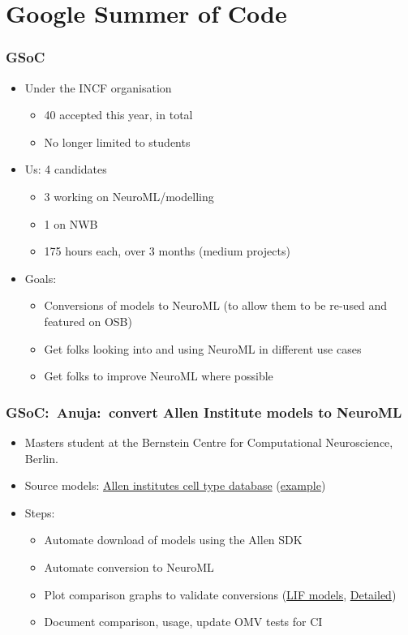 \section{Google Summer of Code}
\begin{frame}[c]
  \frametitle{GSoC}
  \begin{itemize}
    \item Under the INCF organisation
      \begin{itemize}
        \item 40 accepted this year, in total
        \item No longer limited to students
      \end{itemize}
      \pause{}
    \item Us: 4 candidates
      \begin{itemize}
        \item 3 working on NeuroML/modelling
        \item 1 on NWB
        \item 175 hours each, over 3 months (medium projects)
      \end{itemize}
      \pause{}
    \item Goals:
      \begin{itemize}
        \item Conversions of models to NeuroML (to allow them to be re-used and featured on OSB)
        \item Get folks looking into and using NeuroML in different use cases
          \pause{}
        \item Get folks to improve NeuroML where possible
      \end{itemize}
  \end{itemize}
\end{frame}
\begin{frame}[c]
  \frametitle{GSoC:\ Anuja:\ convert Allen Institute models to NeuroML}
  \begin{itemize}
    \item Masters student at the Bernstein Centre for Computational Neuroscience, Berlin.
      \pause{}
    \item Source models: \href{http://celltypes.brain-map.org/}{Allen institutes cell type database} (\href{http://celltypes.brain-map.org/experiment/electrophysiology/474626527}{example})
      \pause{}
    \item Steps:
      \begin{itemize}
        \item Automate download of models using the Allen SDK
        \item Automate conversion to NeuroML
        \item Plot comparison graphs to validate conversions (\href{https://github.com/OpenSourceBrain/AllenInstituteNeuroML/tree/master/CellTypesDatabase/models/GLIF}{LIF models}, \href{https://github.com/OpenSourceBrain/AllenInstituteNeuroML/tree/master/CellTypesDatabase/models}{Detailed})
        \item Document comparison, usage, update OMV tests for CI
      \end{itemize}
  \end{itemize}
\end{frame}
